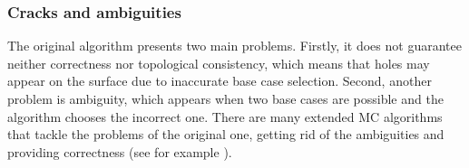 \subsubsection{Cracks and ambiguities}
The original algorithm presents two main problems. Firstly, it does not guarantee neither correctness nor topological consistency, which means that holes may appear on the surface due to inaccurate base case selection. Second, another problem is ambiguity, which appears when two base cases are possible and the algorithm chooses the incorrect one. There are many extended \ac{MC} algorithms that tackle the problems of the original one, getting rid of the ambiguities and providing correctness (see for example \cite{ExtendedMC}).